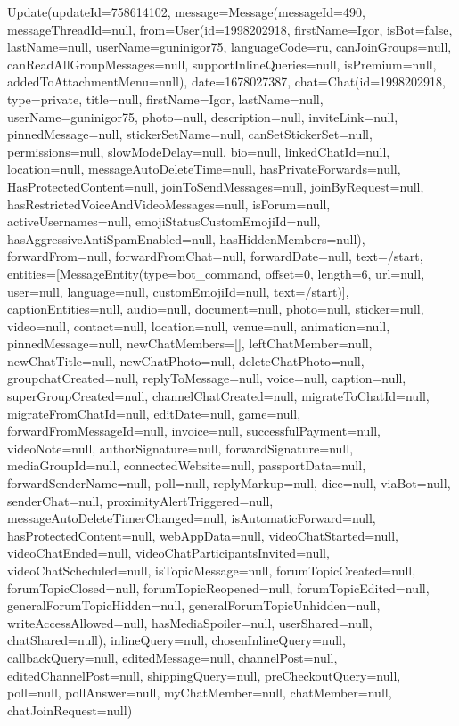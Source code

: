 Update(updateId=758614102,
message=Message(messageId=490, messageThreadId=null,
from=User(id=1998202918, firstName=Igor, isBot=false, lastName=null, userName=guninigor75, languageCode=ru, canJoinGroups=null, canReadAllGroupMessages=null, supportInlineQueries=null, isPremium=null, addedToAttachmentMenu=null), date=1678027387,
chat=Chat(id=1998202918, type=private, title=null, firstName=Igor, lastName=null, userName=guninigor75, photo=null, description=null, inviteLink=null, pinnedMessage=null, stickerSetName=null, canSetStickerSet=null, permissions=null, slowModeDelay=null, bio=null, linkedChatId=null, location=null, messageAutoDeleteTime=null, hasPrivateForwards=null, HasProtectedContent=null, joinToSendMessages=null, joinByRequest=null, hasRestrictedVoiceAndVideoMessages=null, isForum=null, activeUsernames=null, emojiStatusCustomEmojiId=null, hasAggressiveAntiSpamEnabled=null, hasHiddenMembers=null), forwardFrom=null, forwardFromChat=null, forwardDate=null, text=/start, entities=[MessageEntity(type=bot_command, offset=0, length=6, url=null, user=null, language=null, customEmojiId=null, text=/start)], captionEntities=null, audio=null, document=null, photo=null, sticker=null, video=null, contact=null, location=null, venue=null, animation=null, pinnedMessage=null, newChatMembers=[], leftChatMember=null, newChatTitle=null, newChatPhoto=null, deleteChatPhoto=null, groupchatCreated=null, replyToMessage=null, voice=null, caption=null, superGroupCreated=null, channelChatCreated=null, migrateToChatId=null, migrateFromChatId=null, editDate=null, game=null, forwardFromMessageId=null, invoice=null, successfulPayment=null, videoNote=null, authorSignature=null, forwardSignature=null, mediaGroupId=null, connectedWebsite=null, passportData=null, forwardSenderName=null, poll=null, replyMarkup=null, dice=null, viaBot=null, senderChat=null, proximityAlertTriggered=null, messageAutoDeleteTimerChanged=null, isAutomaticForward=null, hasProtectedContent=null, webAppData=null, videoChatStarted=null, videoChatEnded=null, videoChatParticipantsInvited=null, videoChatScheduled=null, isTopicMessage=null, forumTopicCreated=null, forumTopicClosed=null, forumTopicReopened=null, forumTopicEdited=null, generalForumTopicHidden=null, generalForumTopicUnhidden=null, writeAccessAllowed=null, hasMediaSpoiler=null, userShared=null, chatShared=null), inlineQuery=null, chosenInlineQuery=null, callbackQuery=null, editedMessage=null, channelPost=null, editedChannelPost=null, shippingQuery=null, preCheckoutQuery=null, poll=null, pollAnswer=null, myChatMember=null, chatMember=null, chatJoinRequest=null)
